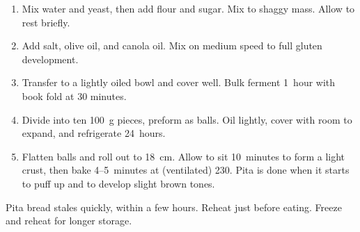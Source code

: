 
\begin{ingredients}
\end{ingredients}


\begin{recipe}
  \begin{enumerate}

  \item Mix water and yeast, then add flour and sugar.  Mix to shaggy
    mass.  Allow to rest briefly.

  \item Add salt, olive oil, and canola oil.  Mix on medium speed to
    full gluten development.

  \item Transfer to a lightly oiled bowl and cover well.  Bulk ferment
    1~hour with book fold at 30 minutes.

  \item Divide into ten 100~g pieces, preform as balls.  Oil lightly,
    cover with room to expand, and refrigerate 24~hours.

  \item Flatten balls and roll out to 18~cm.  Allow to sit 10~minutes
    to form a light crust, then bake 4\fracH--5~minutes at (ventilated)
    230\degreeC.  Pita is done when it starts to puff up and to
    develop slight brown tones.

  \end{enumerate}
\end{recipe}

Pita bread stales quickly, within a few hours.  Reheat just before
eating.  Freeze and reheat for longer storage.


